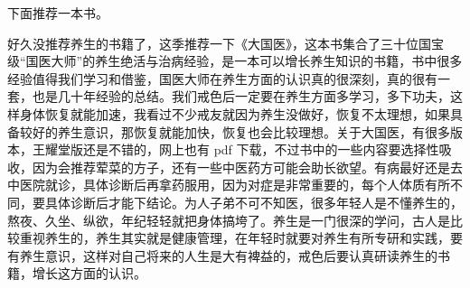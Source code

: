 下面推荐一本书。

\begin{book}
    好久没推荐养生的书籍了，这季推荐一下《大国医》，这本书集合了三十位国宝级“国医大师”的养生绝活与治病经验，是一本可以增长养生知识的书籍，书中很多经验值得我们学习和借鉴，国医大师在养生方面的认识真的很深刻，真的很有一套，也是几十年经验的总结。我们戒色后一定要在养生方面多学习，多下功夫，这样身体恢复就能加速，我看过不少戒友就因为养生没做好，恢复不太理想，如果具备较好的养生意识，那恢复就能加快，恢复也会比较理想。关于大国医，有很多版本，王耀堂版还是不错的，网上也有 pdf 下载，不过书中的一些内容要选择性吸收，因为会推荐荤菜的方子，还有一些中医药方可能会助长欲望。有病最好还是去中医院就诊，具体诊断后再拿药服用，因为对症是非常重要的，每个人体质有所不同，要具体诊断后才能下结论。为人子弟不可不知医，很多年轻人是不懂养生的，熬夜、久坐、纵欲，年纪轻轻就把身体搞垮了。养生是一门很深的学问，古人是比较重视养生的，养生其实就是健康管理，在年轻时就要对养生有所专研和实践，要有养生意识，这样对自己将来的人生是大有裨益的，戒色后要认真研读养生的书籍，增长这方面的认识。
\end{book}
